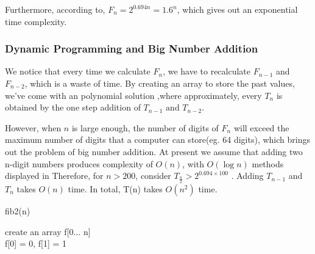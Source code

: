 Furthermore, according to, $F_n=2^{0.694n}=1.6^{n}$, which gives out an exponential time complexity.

\subsubsection{Dynamic Programming and Big Number Addition}
We notice that every time we calculate $F_n$, we have to recalculate $F_{n-1}$ and $F_{n-2}$, which is a waste of time. 
By creating an array to store the past values, we've come with an polynomial solution ,where approximately, every $T_n$ is obtained by the one step addition of $T_{n-1} \text{ and } T_{n-2} $.

However, when $n$ is large enough, the number of digits of $F_n$ will exceed the maximum number of digits that a computer can store(eg. 64 digits), which brings out the problem of big number addition.
At present we assume that adding two n-digit numbers produces complexity of $O(n)$, with $O(\log n)$ methods displayed in %
Therefore, for $n > 200$, consider $T_{\frac{n}{2}} > 2^{0.694\times100} $ . Adding $T_{n-1}$ and $T_{n}$ takes $O(n)$ time. In total, T(n) takes $O(n^{2})$ time.
\begin{algorithm}
    \caption{fib2(n)}
    create an array f[0$\dots$ n]\\
    f[0] = 0, f[1] = 1\\
\end{algorithm}

